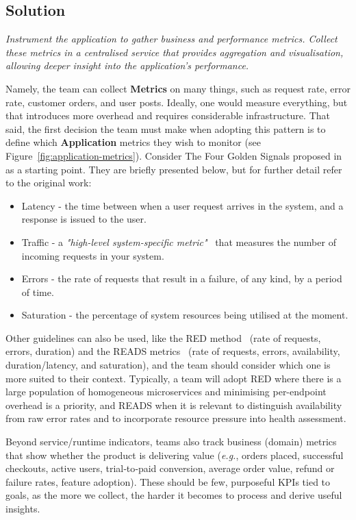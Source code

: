 \documentclass[runningheads]{llncs}
\begin{document}
\subsection{Solution}
\textit{Instrument the application to gather business and performance metrics. Collect these metrics in a centralised service that provides aggregation and visualisation, allowing deeper insight into the application's performance.}
\vspace{0.3cm}

Namely, the team can collect \textbf{Metrics} on many things, such as request rate, error rate, customer orders, and user posts. Ideally, one would measure everything, but that introduces more overhead and requires considerable infrastructure. That said, the first decision the team must make when adopting this pattern is to define which \textbf{Application} metrics they wish to monitor (see Figure~\ref{fig:application-metrics}). Consider The Four Golden Signals proposed in~\cite{Ewaschuk-SRE-2016} as a starting point. They are briefly presented below, but for further detail refer to the original work:
\begin{itemize}
    \item Latency - the time between when a user request arrives in the system, and a response is issued to the user.
    \item Traffic - a \textit{"high-level system-specific metric"}~\cite{Ewaschuk-SRE-2016} that measures the number of incoming requests in your system.
    \item Errors - the rate of requests that result in a failure, of any kind, by a period of time.
    \item Saturation - the percentage of system resources being utilised at the moment.
\end{itemize}

Other guidelines can also be used, like the RED method~\cite{Jackson-Red-2018} (rate of requests, errors, duration) and the READS metrics~\cite{Gupta-READS-2022} (rate of requests, errors, availability, duration/latency, and saturation), and the team should consider which one is more suited to their context. Typically, a team will adopt RED where there is a large population of homogeneous microservices and minimising per-endpoint overhead is a priority, and READS when it is relevant to distinguish availability from raw error rates and to incorporate resource pressure into health assessment. 

Beyond service/runtime indicators, teams also track business (domain) metrics that show whether the product is delivering value (\textit{e.g.}, orders placed, successful checkouts, active users, trial‑to‑paid conversion, average order value, refund or failure rates, feature adoption). These should be few, purposeful KPIs tied to goals, as the more we collect, the harder it becomes to process and derive useful insights. 
\end{document}
